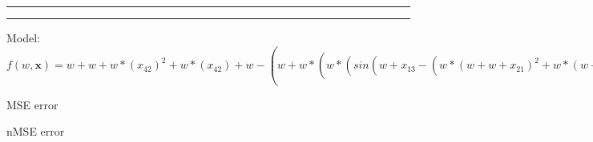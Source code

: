 \documentclass[12pt]{article}
\begin{document}
\hrule
\vspace{1cm}
\hrule
\vspace{1cm}
Model: $f(w,\mathbf{x})=w+w+w*(x_42)^2+w*(x_42)+w-(w+w*(w*(sin(w+x_13-(w*(w+w+x_21)^2+w*(w+w+x_21)+w)))^2+w*(sin(w+x_13-(w*(w+w+x_21)^2+w*(w+w+x_21)+w)))+w)^2+w*(w*(sin(w+x_13-(w*(w+w+x_21)^2+w*(w+w+x_21)+w)))^2+w*(sin(w+x_13-(w*(w+w+x_21)^2+w*(w+w+x_21)+w)))+w)+w-(w*(w*(w*(sin(w+x_13-(w*(w+w+x_21)^2+w*(w+w+x_21)+w)))^2+w*(sin(w+x_13-(w*(w+w+x_21)^2+w*(w+w+x_21)+w)))+w)^2+w*(w*(sin(w+x_13-(w*(w+w+x_21)^2+w*(w+w+x_21)+w)))^2+w*(sin(w+x_13-(w*(w+w+x_21)^2+w*(w+w+x_21)+w)))+w)+w)^2+w*(w*(w*(sin(w+x_13-(w*(w+w+x_21)^2+w*(w+w+x_21)+w)))^2+w*(sin(w+x_13-(w*(w+w+x_21)^2+w*(w+w+x_21)+w)))+w)^2+w*(w*(sin(w+x_13-(w*(w+w+x_21)^2+w*(w+w+x_21)+w)))^2+w*(sin(w+x_13-(w*(w+w+x_21)^2+w*(w+w+x_21)+w)))+w)+w)+w))-(w*(w+sin(x_11)-(x_38))^2+w*(w+sin(x_11)-(x_38))+w)-(w+w*(x_41-(w*(x_42)^2+w*(x_42)+w-(w*(x_35-(x_1))^2+w*(x_35-(x_1))+w)))^2+w*(x_41-(w*(x_42)^2+w*(x_42)+w-(w*(x_35-(x_1))^2+w*(x_35-(x_1))+w)))+w)$

MSE error

nMSE error
\end{document}
